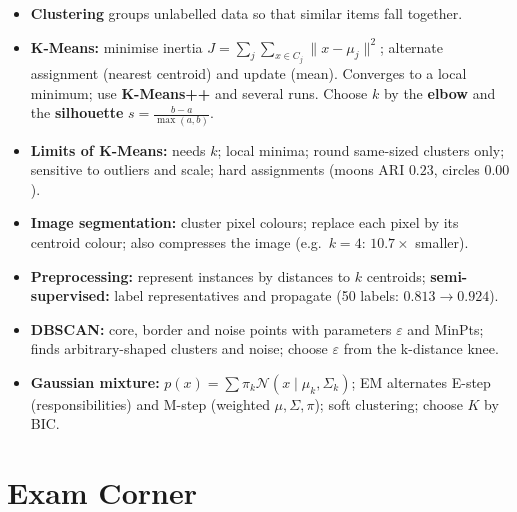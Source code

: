 \begin{summary}
\begin{itemize}
  \item \textbf{Clustering} groups unlabelled data so that similar items fall together.
  \item \textbf{K-Means:} minimise inertia $J=\sum_j\sum_{x\in C_j}\|x-\mu_j\|^2$; alternate assignment (nearest centroid) and update (mean). Converges to a local minimum; use \textbf{K-Means++} and several runs. Choose $k$ by the \textbf{elbow} and the \textbf{silhouette} $s=\frac{b-a}{\max(a,b)}$.
  \item \textbf{Limits of K-Means:} needs $k$; local minima; round same-sized clusters only; sensitive to outliers and scale; hard assignments (moons ARI $0.23$, circles $0.00$).
  \item \textbf{Image segmentation:} cluster pixel colours; replace each pixel by its centroid colour; also compresses the image (e.g.\ $k=4$: $10.7\times$ smaller).
  \item \textbf{Preprocessing:} represent instances by distances to $k$ centroids; \textbf{semi-supervised:} label representatives and propagate (50 labels: $0.813\to0.924$).
  \item \textbf{DBSCAN:} core, border and noise points with parameters $\varepsilon$ and MinPts; finds arbitrary-shaped clusters and noise; choose $\varepsilon$ from the k-distance knee.
  \item \textbf{Gaussian mixture:} $p(x)=\sum\pi_k\mathcal N(x\mid\mu_k,\Sigma_k)$; EM alternates E-step (responsibilities) and M-step (weighted $\mu,\Sigma,\pi$); soft clustering; choose $K$ by BIC.
\end{itemize}
\end{summary}

\section*{Exam Corner}

